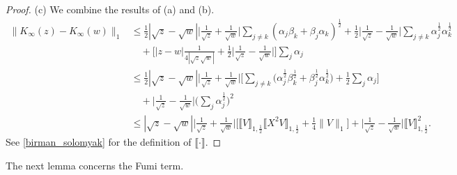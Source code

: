 \begin{proof}
(c)
We combine the results of (a) and (b). 
\begin{equation*}
\begin{split}\|
  K_\infty(z) - K_\infty(w) \|_1 
    & \leq \frac{1}{2} |\sqrt{z}-\sqrt{w}| \Big|\frac{1}{\sqrt{z}} 
            + \frac{1}{\sqrt{w}}\Big| \sum_{j\neq k} (\alpha_j\beta_k+\beta_j\alpha_k)^{\frac{1}{2}} 
            + \frac{1}{2}\Big|\frac{1}{\sqrt{z}} - \frac1{\sqrt{w}}\Big| \sum_{j\not=k} \alpha_j^{\frac{1}{2}} \alpha_k^{\frac{1}{2}} \\
    & \quad +\Big[|z-w| \frac{1}{4|\sqrt{z}\sqrt{w}|} +\frac{1}{2} \Big|\frac{1}{\sqrt{z}} - \frac{1}{\sqrt{w}}\Big|\Big]\sum_j\alpha_j \\
    & \leq \frac{1}{2} |\sqrt{z}-\sqrt{w}| \Big|\frac{1}{\sqrt{z}} 
            + \frac1{\sqrt{w}}\Big| \Big[\sum_{j\neq k} \big(\alpha_j^{\frac{1}{2}}\beta_k^{\frac{1}{2}}+\beta_j^{\frac{1}{2}}\alpha_k^{\frac{1}{2}}\big) 
            +\frac{1}{2} \sum_{j}\alpha_j\Big] \\
    & \quad + \Big|\frac{1}{\sqrt{z}} - \frac{1}{\sqrt{w}}\Big|\Big(\sum_j\alpha_j^{\frac{1}{2}}\Big)^2 \\
    & \leq  |\sqrt{z}-\sqrt{w}| \Big|\frac{1}{\sqrt{z}}+\frac{1}{\sqrt{w}}\Big| 
            \big[\llbracket V\rrbracket_{1,\frac{1}{2}} \llbracket X^2 V\rrbracket_{1,\frac{1}{2}} + \frac{1}{4} \|V\|_1 \big] 
              + \Big|\frac{1}{\sqrt{z}}-\frac{1}{\sqrt{w}}\Big| \llbracket V\rrbracket_{1,\frac{1}{2}}^2.
\end{split}
\end{equation*}
See \eqref{birman_solomyak} for the definition of $\llbracket\cdot\rrbracket$.
\end{proof}

The next lemma concerns the Fumi term.

